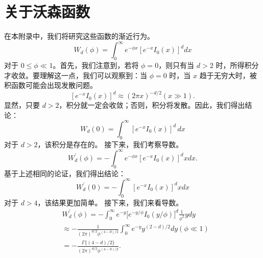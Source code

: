 \section{关于沃森函数}\label{g-ux5173ux4e8eux6c83ux68eeux51fdux6570}
在本附录中，我们将研究这些函数的渐近行为。
\begin{equation}\tag{17.7.1}\label{eq:17.7.1}
W _ { d } ( \phi ) = \int _ { 0 } ^{\infty} e ^{- \phi x} \left[ e ^{- x} I _ { 0 } ( x ) \right] ^{d} d x
\end{equation}
对于 \(0 \leq \phi \ll 1\)。首先，我们注意到，若将 \(\phi = 0\)，则只有当 \(d > 2\) 时，所得积分才收敛。要理解这一点，我们可以观察到：当 \(\phi = 0\) 时，当 \(x\) 趋于无穷大时，被积函数可能会出现发散问题。
\begin{equation}\tag{17.7.2}\label{eq:17.7.2}
\left[ e ^{- x} I _ { 0 } ( x ) \right] ^{d} \approx ( 2 \pi x ) ^{- d / 2}  ( x \gg 1 ) .
\end{equation}
显然，只要 \(d > 2\)，积分就一定会收敛；否则，积分将发散。因此，我们得出结论：
\begin{equation}\tag{17.7.3}\label{eq:17.7.3}
W _ { d } ( 0 ) = \int _ { 0 } ^{\infty} [ e ^{- x} I _ { 0 } ( x ) ] ^{d} \, d x
\end{equation}
对于 \(d > 2\)，该积分是存在的。
接下来，我们考察导数。
\begin{equation}\tag{17.7.4}\label{eq:17.7.4}
W _ { d } ^{\prime} ( \phi ) = - \int _ { 0 } ^{\infty} e ^{- \phi x} [ e ^{- x} I _ { 0 } ( x ) ] ^{d} x d x .
\end{equation}
基于上述相同的论证，我们得出结论：
\begin{equation}\tag{17.7.5}\label{eq:17.7.5}
W _ { d } ^{\prime} ( 0 ) = - \int _ { 0 } ^{\infty} \left[ e ^{- x} I _ { 0 } ( x ) \right] ^{d} x d x
\end{equation}
对于 \(d > 4\)，该结果更加简单。
接下来，我们来看导数。
\begin{equation}\tag{17.7.6}\label{eq:17.7.6}
\begin{array}{rl} & { W _ { d } ^{\prime} ( \phi ) = - \int _ { 0 } ^{\infty} e ^{- y} \Big [ e ^{- y / \phi} I _ { 0 } ( y / \phi ) \Big ] ^{d} \frac { 1 } { \phi ^{2} } y d y } \\& { \approx - \frac { 1 } { ( 2 \pi ) ^{d / 2} \phi ^{( 4 - d ) / 2} } \int _ { 0 } ^{\infty} e ^{- y} y ^{( 2 - d ) / 2} d y  ( \phi \ll 1 ) } \\& { = - \frac { \Gamma \{ ( 4 - d ) / 2 \} } { ( 2 \pi ) ^{d / 2} \phi ^{( 4 - d ) / 2} } . } \end{array}
\end{equation}
